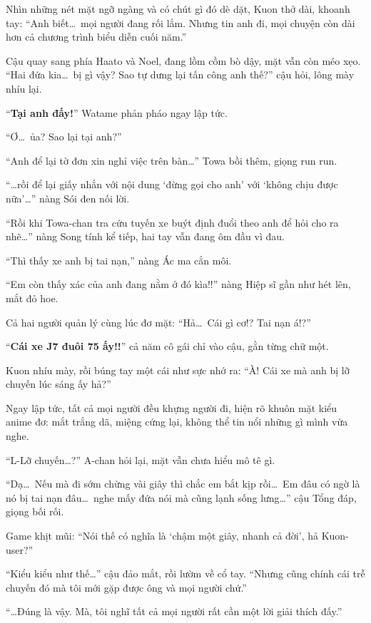 \documentclass[../main.tex]{subfiles}
\begin{document}
Nhìn những nét mặt ngỡ ngàng và có chút gì đó dè dặt, Kuon thở dài, khoanh tay: ``Anh biết\dots\ mọi người đang rối lắm. Nhưng tin anh đi, mọi chuyện còn dài hơn cả chương trình biểu diễn cuối năm.''

Cậu quay sang phía Haato và Noel, đang lồm cồm bò dậy, mặt vẫn còn méo xẹo. ``Hai đứa kia\dots\ bị gì vậy? Sao tự dưng lại tấn công anh thế?'' cậu hỏi, lông mày nhíu lại.

``\textbf{Tại anh đấy!}'' Watame phản pháo ngay lập tức.

``Ơ\dots\ ủa? Sao lại tại anh?''

``Anh để lại tờ đơn xin nghỉ việc trên bàn\dots'' Towa bồi thêm, giọng run run.

``\dots rồi để lại giấy nhắn với nội dung `đừng gọi cho anh' với `không chịu được nữa'\dots'' nàng Sói đen nối lời.

``Rồi khi Towa-chan tra cứu tuyến xe buýt định đuổi theo anh để hỏi cho ra nhẽ\dots'' nàng Song tính kể tiếp, hai tay vẫn đang ôm đầu vì đau.

``Thì thấy xe anh bị tai nạn,'' nàng Ác ma cắn môi.

``Em còn thấy xác của anh đang nằm ở đó kìa!!'' nàng Hiệp sĩ gần như hét lên, mắt đỏ hoe.

Cả hai người quản lý cùng lúc đơ mặt: ``Hả\dots\ Cái gì cơ!? Tai nạn á!?''

``\textbf{Cái xe J7 đuôi 75 ấy!!}'' cả năm cô gái chỉ vào cậu, gằn từng chữ một.

Kuon nhíu mày, rồi búng tay một cái như sực nhớ ra: ``À! Cái xe mà anh bị lỡ chuyến lúc sáng ấy hả?''

Ngay lập tức, tất cả mọi người đều khựng người đi, hiện rõ khuôn mặt kiểu anime đơ: mắt trắng dã, miệng cứng lại, không thể tin nổi những gì mình vừa nghe.

``L-Lỡ chuyến\dots?'' A-chan hỏi lại, mặt vẫn chưa hiểu mô tê gì.

``Dạ\dots\ Nếu mà đi sớm chừng vài giây thì chắc em bắt kịp rồi\dots\ Em đâu có ngờ là nó bị tai nạn đâu\dots\ nghe mấy đứa nói mà cũng lạnh sống lưng\dots'' cậu Tổng đáp, giọng bối rối.

Game khịt mũi: ``Nói thế có nghĩa là `chậm một giây, nhanh cả đời', hả Kuon-user?''

``Kiểu kiểu như thế\dots'' cậu đảo mắt, rồi lườm về cổ tay. ``Nhưng cũng chính cái trễ chuyến đó mà tôi mới gặp được ông và mọi người chứ.''

``\dots Đúng là vậy. Mà, tôi nghĩ tất cả mọi người rất cần một lời giải thích đấy.''
\end{document}
